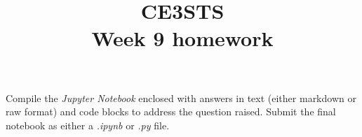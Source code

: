 \documentclass{article}
\title{CE3STS \\ Week 9 homework}
\author{}
\begin{document}
\maketitle

Compile the \textit{Jupyter Notebook} enclosed with answers in text (either markdown or raw format) and code blocks to address the question raised. Submit the final notebook as either a \textit{.ipynb} or \textit{.py} file.
\end{document}
